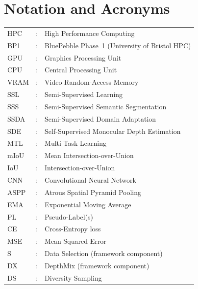 \documentclass[
  oneside,
  author={Shijie Lu},
  degree={BSc},
  title={Label-Efficient Semantic Segmentation via Self-Supervised Depth Estimation and Cross-Task Consistency},
  unit={COMS30045},
  subtitle={}
]{dissertation}
\begin{document}
\chapter*{Notation and Acronyms}

\noindent
\begin{tabular}{lcl}
HPC         &:& High Performance Computing                        \\
BP1         &:& BluePebble Phase~1 (University of Bristol HPC)   \\
GPU         &:& Graphics Processing Unit                          \\
CPU         &:& Central Processing Unit                           \\
VRAM        &:& Video Random-Access Memory                        \\
SSL         &:& Semi-Supervised Learning                          \\
SSS         &:& Semi-Supervised Semantic Segmentation             \\
SSDA        &:& Semi-Supervised Domain Adaptation                 \\
SDE         &:& Self-Supervised Monocular Depth Estimation        \\
MTL         &:& Multi-Task Learning                               \\
mIoU        &:& Mean Intersection-over-Union                      \\
IoU         &:& Intersection-over-Union                           \\
CNN         &:& Convolutional Neural Network                      \\
ASPP        &:& Atrous Spatial Pyramid Pooling                    \\
EMA         &:& Exponential Moving Average                        \\
PL          &:& Pseudo-Label(s)                                   \\
CE          &:& Cross-Entropy loss                                \\
MSE         &:& Mean Squared Error                                \\
S           &:& Data Selection (framework component)              \\
DX          &:& DepthMix (framework component)                    \\
DS          &:& Diversity Sampling                                \\

\end{tabular}
\end{document}
